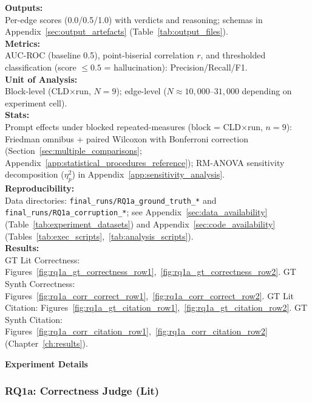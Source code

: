 \textbf{Outputs:}\\
Per-edge scores (0.0/0.5/1.0) with verdicts and reasoning; schemas in Appendix~\ref{sec:output_artefacts} (Table~\ref{tab:output_files}).\\
\textbf{Metrics:}\\
AUC-ROC (baseline 0.5), point-biserial correlation $r$, and thresholded classification (score $\leq 0.5$ = hallucination): Precision/Recall/F1.\\
\textbf{Unit of Analysis:}\\
Block-level (CLD$\times$run, $N=9$); edge-level ($N \approx 10{,}000$--$31{,}000$ depending on experiment cell).\\
\textbf{Stats:}\\
Prompt effects under blocked repeated-measures (block = CLD$\times$run, $n{=}9$): Friedman omnibus + paired Wilcoxon with Bonferroni correction (Section~\ref{sec:multiple_comparisons}; Appendix~\ref{app:statistical_procedures_reference}); RM-ANOVA sensitivity decomposition ($\eta^2_p$) in Appendix~\ref{app:sensitivity_analysis}.\\
\textbf{Reproducibility:}\\
Data directories: \texttt{final\_runs/RQ1a\_ground\_truth\_*} and \texttt{final\_runs/RQ1a\_corruption\_*}; see Appendix~\ref{sec:data_availability} (Table~\ref{tab:experiment_datasets}) and Appendix~\ref{sec:code_availability} (Tables~\ref{tab:exec_scripts},~\ref{tab:analysis_scripts}).\\
\textbf{Results:}\\
GT Lit Correctness: Figures~\ref{fig:rq1a_gt_correctness_row1},~\ref{fig:rq1a_gt_correctness_row2}. GT Synth Correctness: Figures~\ref{fig:rq1a_corr_correct_row1},~\ref{fig:rq1a_corr_correct_row2}. GT Lit Citation: Figures~\ref{fig:rq1a_gt_citation_row1},~\ref{fig:rq1a_gt_citation_row2}. GT Synth Citation: Figures~\ref{fig:rq1a_corr_citation_row1},~\ref{fig:rq1a_corr_citation_row2} (Chapter~\ref{ch:results}).

\noindent\textbf{Experiment Details}

\subsubsection{RQ1a: Correctness Judge (Lit)}
\label{sec:rq1a_correctness_lit}

